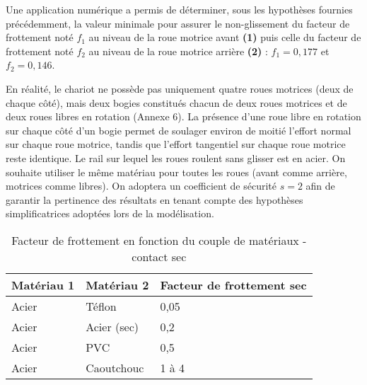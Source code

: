 \ifprof
\begin{corrige}
\end{corrige}
\else
\fi

Une application numérique a permis de déterminer, sous les hypothèses fournies précédemment, la valeur minimale pour assurer le non-glissement du facteur de frottement noté $f_1$ au niveau de la roue motrice avant \textbf{(1)} puis celle du facteur de frottement noté $f_2$ au niveau de la roue motrice arrière \textbf{(2)} : $f_1=0,177$ et $f_2=0,146$.

\ifprof
\begin{corrige}
\end{corrige}
\else
\fi

En réalité, le chariot ne possède pas uniquement quatre roues motrices (deux de chaque côté), mais deux bogies constitués chacun de deux roues motrices et de deux roues libres en rotation (Annexe 6). La présence d'une roue libre en rotation sur chaque côté d'un bogie permet de soulager environ de moitié l'effort normal sur chaque roue motrice, tandis que l'effort tangentiel sur chaque roue motrice reste identique.
Le rail sur lequel les roues roulent sans glisser est en acier. On souhaite utiliser le même matériau pour toutes les roues (avant comme arrière, motrices comme libres).
On adoptera un coefficient de sécurité $s=2$ afin de garantir la pertinence des résultats en tenant compte des hypothèses simplificatrices adoptées lors de la modélisation.

\ifprof
\begin{corrige}
\end{corrige}
\else
\fi


\begin{table}[!h]
\centering
\begin{tabular}{lll}
\hline
\textbf{Matériau 1} & \textbf{Matériau 2} & \textbf{Facteur de frottement sec} \\ 
\hline
Acier	& Téflon & 0,05 \\
Acier	& Acier (sec) & 0,2\\
Acier	& PVC & 0,5\\
Acier	& Caoutchouc & 1 à 4\\
\hline
\end{tabular}
\caption{ \label{tab:CCMP:2021:01} Facteur de frottement en fonction du couple de matériaux - contact sec}
\end{table} 

